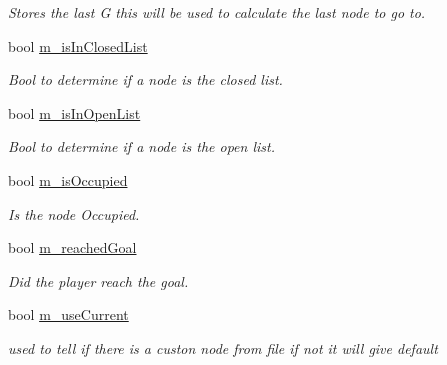 \begin{DoxyCompactItemize}
\begin{DoxyCompactList}\small\item\em Stores the last G this will be used to calculate the last node to go to. \end{DoxyCompactList}\item 
\mbox{\label{class_graph_aa6465aa8769c0558c5cc45ed7f0c872c}} 
bool \mbox{\hyperlink{class_graph_aa6465aa8769c0558c5cc45ed7f0c872c}{m\+\_\+is\+In\+Closed\+List}}
\begin{DoxyCompactList}\small\item\em Bool to determine if a node is the closed list. \end{DoxyCompactList}\item 
\mbox{\label{class_graph_a0bd49d06c83bc659df2491f9efc2af5e}} 
bool \mbox{\hyperlink{class_graph_a0bd49d06c83bc659df2491f9efc2af5e}{m\+\_\+is\+In\+Open\+List}}
\begin{DoxyCompactList}\small\item\em Bool to determine if a node is the open list. \end{DoxyCompactList}\item 
\mbox{\label{class_graph_ae70699a31c78b4f465573ebd88526e05}} 
bool \mbox{\hyperlink{class_graph_ae70699a31c78b4f465573ebd88526e05}{m\+\_\+is\+Occupied}}
\begin{DoxyCompactList}\small\item\em Is the node Occupied. \end{DoxyCompactList}\item 
\mbox{\label{class_graph_a9aed85b6200272857406d2b6d03d4c70}} 
bool \mbox{\hyperlink{class_graph_a9aed85b6200272857406d2b6d03d4c70}{m\+\_\+reached\+Goal}}
\begin{DoxyCompactList}\small\item\em Did the player reach the goal. \end{DoxyCompactList}\item 
\mbox{\label{class_graph_a71ec88e2167f0bd2aeccd9f3baad0ec6}} 
bool \mbox{\hyperlink{class_graph_a71ec88e2167f0bd2aeccd9f3baad0ec6}{m\+\_\+use\+Current}}
\begin{DoxyCompactList}\small\item\em used to tell if there is a custon node from file if not it will give default \end{DoxyCompactList}\end{DoxyCompactItemize}
